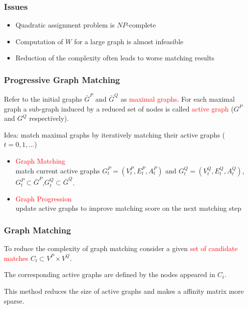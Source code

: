 \documentclass[hyperref={pdfpagelabels=false}]{beamer}
\begin{document}
\begin{frame}
\frametitle{Issues}
\begin{itemize}
\item Quadratic assignment problem is $NP$-complete
\item Computation of $W$ for a large graph is almost infeasible
\item Reduction of the complexity often leads to worse matching results
\end{itemize}
\end{frame}

\begin{frame}
\frametitle{Progressive Graph Matching}
Refer to the initial graphs $\bar{G}^P$ and $\bar{G}^Q$ as \textcolor{red}{maximal graphs}. 
For each maximal graph a sub-graph induced by a reduced set of nodes is called \textcolor{red}{active graph} ($G^P$ and $G^Q$ respectively).

\vspace{10pt}
Idea: match maximal graphs by iteratively matching their active graphs ($t=0,1,\dots$)
\begin{itemize}
\item \textcolor{red}{Graph Matching}\\
		match current active graphs $G_t^P=(V_t^P, E_t^P, A_t^P)$ and $G_t^Q=(V_t^Q, E_t^Q, A_t^Q)$, $G_t^P\subset \bar{G}^P$,$G_t^Q\subset \bar{G}^Q$.
\item \textcolor{red}{Graph Progression}\\
		update active graphs to improve matching score on the next matching step
\end{itemize}

\end{frame}

\begin{frame}
\frametitle{Graph Matching}
To reduce the complexity of graph matching consider a given \textcolor{red}{set of candidate matches} $C_t\subset V^P\times V^Q$.

The corresponding active graphs are defined by the nodes appeared in $C_t$.

This method reduces the size of active graphs and makes a affinity matrix more sparse.

\end{frame}
\end{document}
